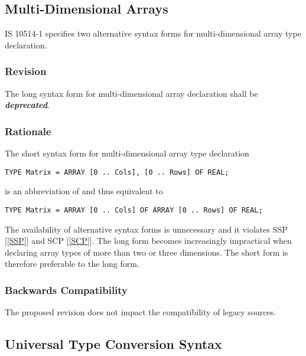 \documentclass[10pt,a4paper,leqno,fleqn]{article}
\renewcommand{\emph}[1]{\textbf{\textit{#1}}}
\begin{document}
\subsection{Multi-Dimensional Arrays}

IS 10514-1 specifies two alternative syntax forms for multi-dimensional
array type declaration.

\subsubsection{Revision}

The long syntax form for multi-dimensional array declaration shall be
\emph{deprecated}.

\subsubsection{Rationale}

The short syntax form for multi-dimensional array type declaration

\lstset{style=modula2}
\begin{lstlisting}
TYPE Matrix = ARRAY [0 .. Cols], [0 .. Rows] OF REAL;
\end{lstlisting}

\noindent is an abbreviation of and thus equivalent to 
\lstset{style=modula2}
\begin{lstlisting}
TYPE Matrix = ARRAY [0 .. Cols] OF ARRAY [0 .. Rows] OF REAL;
\end{lstlisting}

\par\noindent The availability of alternative syntax forms is unnecessary
and it violates SSP [\ref{SSP}] and SCP [\ref{SCP}]. The long form becomes
increasingly impractical when declaring array types of more than two or three
dimensions. The short form is therefore preferable to the long form.

\subsubsection{Backwards Compatibility}

The proposed revision does not impact the compatibility of legacy sources.


\subsection{Universal Type Conversion Syntax}
\label{UTCS}
\end{document}
